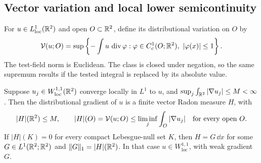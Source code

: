 \subsection{Vector variation and local lower semicontinuity}

For $u\in L^1_{\mathrm{loc}}(\mathbb R^2)$ and open $O\subset\mathbb R^2$,
define its distributional variation on $O$ by
\begin{equation}\label{eq:appendix-variation}
 \mathcal V(u;O)=
 \sup\left\{-\int u\,\operatorname{div}\varphi:
       \varphi\in C_c^1(O;\mathbb R^2),\ |\varphi(x)|\le1\right\}.
\end{equation}
The test-field norm is Euclidean. The class is closed under
negation, so the same supremum results if the tested integral
is replaced by its absolute value.

\begin{lemma}\label{lem:appendix-vector-measure}
Suppose $u_j\in W^{1,1}_{\mathrm{loc}}(\mathbb R^2)$ converge locally
in $L^1$ to $u$, and
$\sup_j\int_{\mathbb R^2}|\nabla u_j|\le M<\infty$.
Then the distributional gradient of $u$ is a finite vector Radon
measure $H$, with
\begin{equation}\label{eq:appendix-local-lsc}
 |H|(\mathbb R^2)\le M,\qquad
 |H|(O)=\mathcal V(u;O)
       \le\liminf_j\int_O|\nabla u_j|
 \quad\text{for every open }O.
\end{equation}
If $|H|(K)=0$ for every compact Lebesgue-null set $K$, then
$H=G\,\dd x$ for some $G\in L^1(\mathbb R^2;\mathbb R^2)$ and
$\|G\|_1=|H|(\mathbb R^2)$. In that case
$u\in W^{1,1}_{\mathrm{loc}}$, with weak gradient $G$.
\end{lemma}

